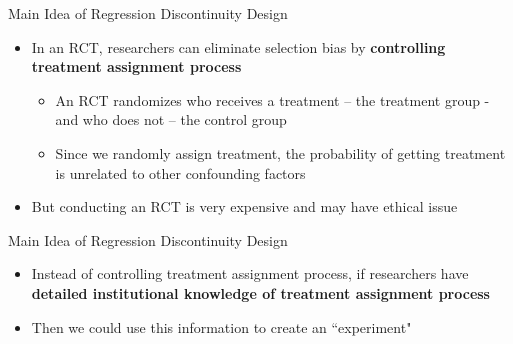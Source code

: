 \documentclass[dvipsnames,hyperref={pdfpagelabels=false}]{beamer}
\begin{document}
	\begin{frame}{Main Idea of Regression Discontinuity Design}{}
		\begin{itemize}
			
			\item In an RCT, researchers can eliminate selection bias by \textbf{controlling treatment assignment process}
			\vspace{0.2cm}
					\begin{itemize}
			
			\item An RCT randomizes who receives a treatment – the treatment group - and who does not – the control group
			\vspace{0.2cm}

			\item Since we randomly assign treatment, the probability of getting treatment is unrelated to other confounding factors 
								\end{itemize}	
			\vspace{0.2cm}	
			\item But conducting an RCT is very expensive and may have ethical issue
			
			
			
		\end{itemize}
	\end{frame}
	
	
	
	
	
	\begin{frame}{Main Idea of Regression Discontinuity Design}{}
		\begin{itemize}
			\item Instead of controlling treatment assignment process, if researchers have \textbf{detailed institutional knowledge of treatment assignment process}
			\vspace{0.2cm}
			\item Then we could use this information to create an ``experiment"
			
			
			
		\end{itemize}
	\end{frame}
	
	
	
	
	
\end{document}
